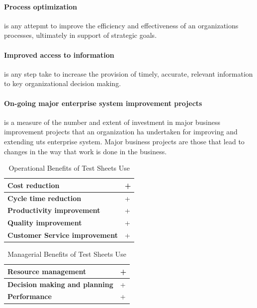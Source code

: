 \paragraph{Process optimization} is any attepmt to improve the efficiency and effectiveness of an organizations processes, ultimately in support of strategic goals.
\paragraph{Improved access to information} is any step take to increase the provision of timely, accurate, relevant information to key organizational decision making.
\paragraph{On-going major enterprise system improvement projects} is a measure of the number and extent of investment in major business improvement projects that an organization ha undertaken for improving and extending uts enterprise system. Major business projects are those that lead to changes in the way that work is done in the business.
\begin{table}[h]
	\begin{center}
		\begin{tabular}{| l | l |  }
			\hline
			\textbf{Cost reduction} & +  \\
			\hline
			\textbf{Cycle time reduction} & + \\
			\hline
			\textbf{Productivity improvement} & +  \\
			\hline
			\textbf{Quality improvement} & + \\
			\hline 
			\textbf{Customer Service improvement} & + \\
			\hline
		\end{tabular}
	\end{center}
	\caption{Operational Benefits of Test Sheets Use}
\end{table}

\begin{table}[h]
	\begin{center}
		\begin{tabular}{| l | l |  }
			\hline
			\textbf{Resource management} & +  \\
			\hline
			\textbf{Decision making and planning} & + \\
			\hline
			\textbf{Performance} & +  \\
			\hline
		\end{tabular}
	\end{center}
	\caption{Managerial Benefits of Test Sheets Use}
\end{table}


